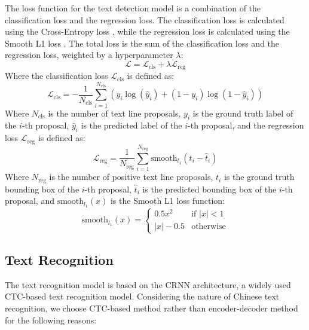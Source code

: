 \documentclass[12pt,twoside]{report}
\begin{document}
The loss function for the text detection model is a combination of the classification loss and the regression loss. The classification loss is calculated using the Cross-Entropy loss \cite{crossentropyloss}, while the regression loss is calculated using the Smooth L1 loss \cite{smoothl1loss}. The total loss is the sum of the classification loss and the regression loss, weighted by a hyperparameter $\lambda$:
\begin{equation}
    \mathcal{L} = \mathcal{L}_{\text{cls}} + \lambda \mathcal{L}_{\text{reg}}
\end{equation}
Where the classification loss $\mathcal{L}_{\text{cls}}$ is defined as:
\begin{equation}
    \mathcal{L}_{\text{cls}} = -\frac{1}{N_{\text{cls}}} \sum_{i=1}^{N_{\text{cls}}} \left( y_i \log(\hat{y}_i) + (1 - y_i) \log(1 - \hat{y}_i) \right)
\end{equation}
Where $N_{\text{cls}}$ is the number of text line proposals, $y_i$ is the ground truth label of the $i$-th proposal, $\hat{y}_i$ is the predicted label of the $i$-th proposal, and the regression loss $\mathcal{L}_{\text{reg}}$ is defined as:
\begin{equation}
    \mathcal{L}_{\text{reg}} = \frac{1}{N_{\text{reg}}} \sum_{i=1}^{N_{\text{reg}}} \text{smooth}_{l_1}(t_i - \hat{t}_i)
\end{equation}
Where $N_{\text{reg}}$ is the number of positive text line proposals, $t_i$ is the ground truth bounding box of the $i$-th proposal, $\hat{t}_i$ is the predicted bounding box of the $i$-th proposal, and $\text{smooth}_{l_1}(x)$ is the Smooth L1 loss function:
\begin{equation}
    \text{smooth}_{l_1}(x) = \begin{cases}
        0.5 x^2 & \text{if } |x| < 1 \\
        |x| - 0.5 & \text{otherwise}
    \end{cases}
\end{equation}

\subsection{Text Recognition}
\label{sec:text_recognition}
The text recognition model is based on the CRNN \cite{shi2016end} architecture, a widely used CTC-based text recognition model. Considering the nature of Chinese text recognition, we choose CTC-based method rather than encoder-decoder method for the following reasons:
\end{document}
